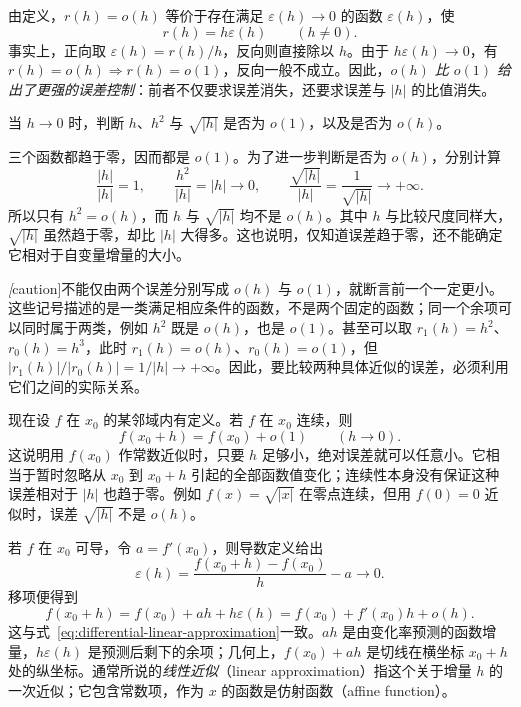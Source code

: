 由定义，$r(h)=o(h)$ 等价于存在满足 $\varepsilon(h)\to0$ 的函数 $\varepsilon(h)$，使
\begin{equation}
    r(h)=h\varepsilon(h)\qquad(h\ne0).
    \label{eq:peano-little-o-factorization}
\end{equation}
事实上，正向取 $\varepsilon(h)=r(h)/h$，反向则直接除以 $h$。由于 $h\varepsilon(h)\to0$，有 $r(h)=o(h)\Longrightarrow r(h)=o(1)$，反向一般不成立。因此，\emph{$o(h)$ 比 $o(1)$ 给出了更强的误差控制}：前者不仅要求误差消失，还要求误差与 $|h|$ 的比值消失。

\begin{example}
\label{ex:peano-little-o-basic-comparisons}
当 $h\to0$ 时，判断 $h$、$h^2$ 与 $\sqrt{|h|}$ 是否为 $o(1)$，以及是否为 $o(h)$。
\end{example}

\begin{solve}
三个函数都趋于零，因而都是 $o(1)$。为了进一步判断是否为 $o(h)$，分别计算
\[
    \frac{|h|}{|h|}=1,\qquad
    \frac{h^2}{|h|}=|h|\to0,\qquad
    \frac{\sqrt{|h|}}{|h|}=\frac1{\sqrt{|h|}}\to+\infty.
\]
所以只有 $h^2=o(h)$，而 $h$ 与 $\sqrt{|h|}$ 均不是 $o(h)$。其中 $h$ 与比较尺度同样大，$\sqrt{|h|}$ 虽然趋于零，却比 $|h|$ 大得多。这也说明，仅知道误差趋于零，还不能确定它相对于自变量增量的大小。
\end{solve}

\emph[caution]{不能仅由两个误差分别写成 $o(h)$ 与 $o(1)$，就断言前一个一定更小。}这些记号描述的是一类满足相应条件的函数，不是两个固定的函数；同一个余项可以同时属于两类，例如 $h^2$ 既是 $o(h)$，也是 $o(1)$。甚至可以取 $r_1(h)=h^2$、$r_0(h)=h^3$，此时 $r_1(h)=o(h)$、$r_0(h)=o(1)$，但 $|r_1(h)|/|r_0(h)|=1/|h|\to+\infty$。因此，要比较两种具体近似的误差，必须利用它们之间的实际关系。

现在设 $f$ 在 $x_0$ 的某邻域内有定义。若 $f$ 在 $x_0$ 连续，则
\begin{equation}
    f(x_0+h)=f(x_0)+o(1)\qquad(h\to0).
    \label{eq:peano-continuous-constant-approximation}
\end{equation}
这说明用 $f(x_0)$ 作常数近似时，只要 $h$ 足够小，绝对误差就可以任意小。它相当于暂时忽略从 $x_0$ 到 $x_0+h$ 引起的全部函数值变化；连续性本身没有保证这种误差相对于 $|h|$ 也趋于零。例如 $f(x)=\sqrt{|x|}$ 在零点连续，但用 $f(0)=0$ 近似时，误差 $\sqrt{|h|}$ 不是 $o(h)$。

若 $f$ 在 $x_0$ 可导，令 $a=f'(x_0)$，则导数定义给出
\[
    \varepsilon(h)=\frac{f(x_0+h)-f(x_0)}h-a\longrightarrow0.
\]
移项便得到
\begin{equation}
    f(x_0+h)=f(x_0)+ah+h\varepsilon(h)
           =f(x_0)+f'(x_0)h+o(h).
    \label{eq:peano-first-order-decomposition}
\end{equation}
这与式~\eqref{eq:differential-linear-approximation}一致。$ah$ 是由变化率预测的函数增量，$h\varepsilon(h)$ 是预测后剩下的余项；几何上，$f(x_0)+ah$ 是切线在横坐标 $x_0+h$ 处的纵坐标。通常所说的\emph{线性近似}（linear approximation）指这个关于增量 $h$ 的一次近似；它包含常数项，作为 $x$ 的函数是仿射函数（affine function）。

